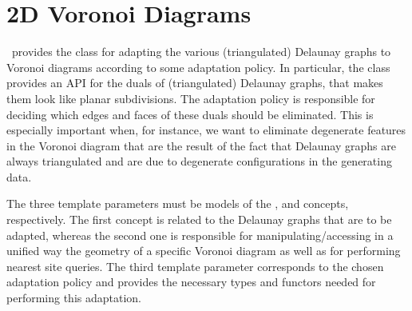 

\chapter{2D Voronoi Diagrams}
\label{ref-chapter-vda2}


\cgal\ provides the class  for
adapting the various (triangulated) Delaunay graphs to Voronoi
diagrams according to some adaptation policy.
In particular, the class 
provides an API for the duals of (triangulated) Delaunay graphs, that
makes them look like planar subdivisions. The adaptation policy is
responsible for deciding which edges and faces of these duals should
be eliminated. This is especially important when, for instance, we
want to eliminate degenerate features in the Voronoi diagram that are
the result of the fact that Delaunay graphs are always triangulated
and are due to degenerate configurations in the generating data.

The three template parameters must be models of the
,  and
 concepts, respectively.
The first concept is related to the Delaunay graphs that are to be
adapted, whereas the second one is responsible for
manipulating/accessing in a unified way the geometry of a specific
Voronoi diagram as well as for performing nearest site queries. 
The third template parameter corresponds to the chosen adaptation
policy and provides the necessary types and functors needed for
performing this adaptation.

\\
\\

